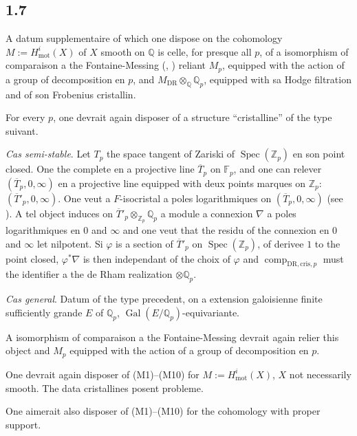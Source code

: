 \documentclass[12pt,a4paper]{article}
\theoremstyle{plain}
\theoremstyle{definition}
\theoremstyle{remark}
\DeclareMathOperator{\Spec}{Spec}
\DeclareMathOperator{\Gal}{Gal}
\newcommand{\mot}{\mathrm{mot}}
\providecommand{\Gal}{\operatorname{Gal}}
\providecommand{\Spec}{\operatorname{Spec}}
\providecommand{\mot}{\mathrm{mot}}
\providecommand{\DR}{\mathrm{DR}}
\providecommand{\cris}{\mathrm{cris}}
\providecommand{\comp}{\operatorname{comp}}
\begin{document}
\subsection*{1.7}

A datum supplementaire of which one dispose on the cohomology $M := H^i_\mot(X)$ of
$X$ smooth on $\mathbb{Q}$ is celle, for presque all $p$, of a isomorphism of
comparaison a the Fontaine-Messing (\cite{FM}, \cite{Fa}) reliant $M_p$, equipped with the action
of a group of decomposition en $p$, and $M_{\DR} \otimes_{\mathbb{Q}} \mathbb{Q}_p$, equipped with
sa Hodge filtration and of son Frobenius cristallin.

For every $p$, one devrait again disposer of a structure ``cristalline'' of the type suivant.

\emph{Cas semi-stable}. Let $T_p$ the space tangent of Zariski of $\Spec(\mathbb{Z}_p)$ en
son point closed. One the complete en a projective line $\overline{T}_p$ on
$\mathbb{F}_p$, and one can relever $(\overline{T}_p, 0, \infty)$ en a projective line
equipped with deux points marques on $\mathbb{Z}_p$: $(\overline{T}'_p, 0, \infty)$. One veut
a $F$-isocristal a poles logarithmiques on $(\overline{T}_p, 0, \infty)$ (see
\cite{Fa}). A tel object induces on $\overline{T}'_p \otimes_{\mathbb{Z}_p} \mathbb{Q}_p$ a
module a connexion $\nabla$ a poles logarithmiques en $0$ and $\infty$ and one veut that
the residu of the connexion en $0$ and $\infty$ let nilpotent. Si $\varphi$ is a section
of $\overline{T}'_p$ on $\Spec(\mathbb{Z}_p)$, of derivee $1$ to the point closed,
$\varphi^*\nabla$ is then independant of the choix of $\varphi$ and
$\comp_{\DR,\cris,p}$ must the identifier a the de Rham realization $\otimes
\mathbb{Q}_p$.

\emph{Cas general}. Datum of the type precedent, on a extension galoisienne finite
sufficiently grande $E$ of $\mathbb{Q}_p$, $\Gal(E/\mathbb{Q}_p)$-equivariante.

A isomorphism of comparaison a the Fontaine-Messing devrait again relier this object
and $M_p$ equipped with the action of a group of decomposition en $p$.

\begin{variante}[1.8]
One devrait again disposer of (M1)--(M10) for $M := H^i_\mot(X)$, $X$ not
necessarily smooth. The data cristallines posent probleme.

One aimerait also disposer of (M1)--(M10) for the cohomology with proper support.
\end{variante}
\end{document}
